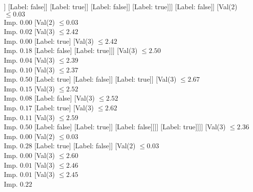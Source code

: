 \documentclass[margin=10pt]{standalone}
\begin{document}
\begin{forest}
																			[Val($3$) $ \leq 2.33$ \\ Imp. $0.11$
																				[Val($3$) $ \leq 2.33$ \\ Imp. $0.50$
																					[Label: false]
																					[Label: true]]
																				[Label: false]]
																			[Label: true]]
																		[Label: false]]
																	[Label: true]]]
															[Label: false]]
														[Val($2$) $ \leq 0.03$ \\ Imp. $0.00$
															[Val($2$) $ \leq 0.03$ \\ Imp. $0.02$
																[Val($3$) $ \leq 2.42$ \\ Imp. $0.00$
																	[Label: true]
																	[Val($3$) $ \leq 2.42$ \\ Imp. $0.18$
																		[Label: false]
																		[Label: true]]]
																[Val($3$) $ \leq 2.50$ \\ Imp. $0.04$
																	[Val($3$) $ \leq 2.39$ \\ Imp. $0.10$
																		[Val($3$) $ \leq 2.37$ \\ Imp. $0.50$
																			[Label: true]
																			[Label: false]]
																		[Label: true]]
																	[Val($3$) $ \leq 2.67$ \\ Imp. $0.15$
																		[Val($3$) $ \leq 2.52$ \\ Imp. $0.08$
																			[Label: false]
																			[Val($3$) $ \leq 2.52$ \\ Imp. $0.17$
																				[Label: true]
																				[Val($3$) $ \leq 2.62$ \\ Imp. $0.11$
																					[Val($3$) $ \leq 2.59$ \\ Imp. $0.50$
																						[Label: false]
																						[Label: true]]
																					[Label: false]]]]
																		[Label: true]]]]
															[Val($3$) $ \leq 2.36$ \\ Imp. $0.00$
																[Val($2$) $ \leq 0.03$ \\ Imp. $0.28$
																	[Label: true]
																	[Label: false]]
																[Val($2$) $ \leq 0.03$ \\ Imp. $0.00$
																	[Val($3$) $ \leq 2.60$ \\ Imp. $0.01$
																		[Val($3$) $ \leq 2.46$ \\ Imp. $0.01$
																			[Val($3$) $ \leq 2.45$ \\ Imp. $0.22$

\end{forest}
\end{document}
